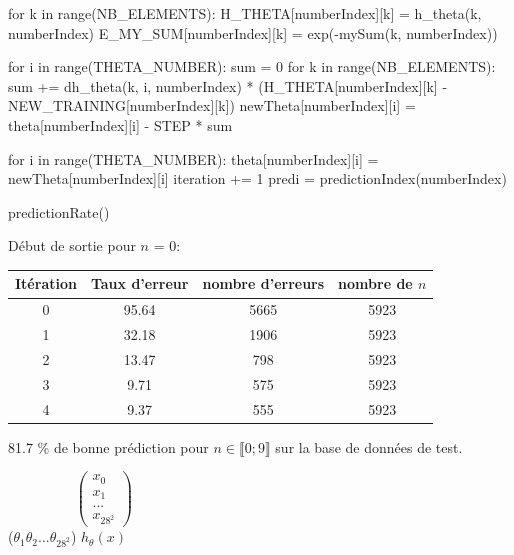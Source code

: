 \documentclass{beamer}
\newcommand{\icol}[1]{
  \left(\begin{smallmatrix}#1\end{smallmatrix}\right)
}
\begin{document}
\begin{casepython}
        for k in range(NB_ELEMENTS):
            H_THETA[numberIndex][k] = h_theta(k, numberIndex)
            E_MY_SUM[numberIndex][k] = exp(-mySum(k, numberIndex))
                
        for i in range(THETA_NUMBER):
            sum = 0
            for k in range(NB_ELEMENTS):
                sum += dh_theta(k, i, numberIndex) * (H_THETA[numberIndex][k] - NEW_TRAINING[numberIndex][k])
            newTheta[numberIndex][i] = theta[numberIndex][i] - STEP * sum
        
        for i in range(THETA_NUMBER):
            theta[numberIndex][i] = newTheta[numberIndex][i]
        iteration += 1
        predi = predictionIndex(numberIndex)

predictionRate()
\end{casepython}

\newpage

\normalsize
Début de sortie pour $n$ = 0:\\

\begin{tabular}{ |c|c|c|c| } 
	 \hline
	 Itération & Taux d'erreur & nombre d'erreurs & nombre de $n$\\ 
	 \hline
	 0 & 95.64 & 5665 & 5923\\
	 \hline
	 1 & 32.18 & 1906 & 5923\\
	 \hline
	 2 & 13.47 & 798 & 5923\\
	 \hline
	 3 & 9.71 & 575 & 5923\\
	 \hline
	 4 & 9.37 & 555 & 5923\\
	 \hline
\end{tabular}

81.7 \% de bonne prédiction pour $n \in \llbracket 0; 9 \rrbracket$ sur la base de données de test.

\newpage

$\hspace{2cm}\icol{x_0\\x_1\\...\\x_{28^2}}$\\
\vspace{0.3cm}($\theta_1 \theta_2 ... \theta_{28^2}$) $h_\theta(x)$

\newpage
\end{document}
